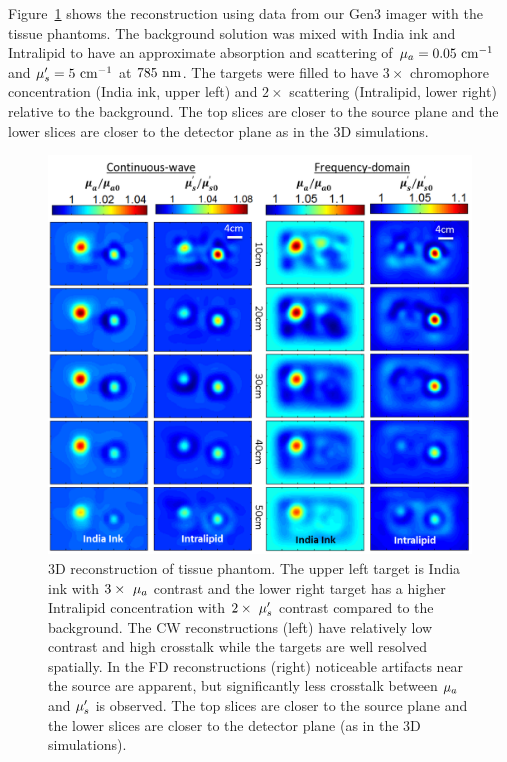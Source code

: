 Figure~\ref{fig:3DFDCW} shows the reconstruction using data from our Gen3 imager with the tissue phantoms. The background solution was mixed with India ink and Intralipid to have an approximate absorption and scattering of $\mu_a=0.05~\rm{cm}^{-1}$ and $\mu_s^{\prime}=5~\rm{cm}^{-1}$ at $785~\rm{nm}$. The targets were filled to have $3\times$ chromophore concentration (India ink, upper left) and $2\times$ scattering (Intralipid, lower right) relative to the background. The top slices are closer to the source plane and the lower slices are closer to the detector plane as in the 3D simulations.
\begin{figure}[!htp]
\begin{center}
\includegraphics[width=14.5cm]{./figures/4_Gen3/3DFDCW.png}
\caption[3D reconstruction of tissue phantom in frequency-domain]{3D reconstruction of tissue phantom. The upper left target is India ink with $3\times~\mu_a$ contrast and the lower right target has a higher Intralipid concentration with $2\times~\mu_s^{\prime}$ contrast compared to the background. The CW reconstructions (left) have relatively low contrast and high crosstalk while the targets are well resolved spatially. In the FD reconstructions (right) noticeable artifacts near the source are apparent, but significantly less crosstalk between $\mu_a$ and $\mu_s^{\prime}$ is observed. The top slices are closer to the source plane and the lower slices are closer to the detector plane (as in the 3D simulations).}
\label{fig:3DFDCW}
\end{center}
\end{figure}

